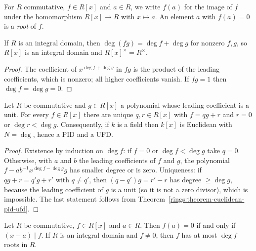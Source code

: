 \begin{notation}\label{rings:notation-evaluation}
For $R$ commutative, $f \in R[x]$ and $a \in R$, we write $f(a)$ for the image of $f$ under
the homomorphism $R[x] \to R$ with $x \mapsto a$. An element $a$ with $f(a) = 0$ is a
\emph{root} of $f$.
\end{notation}

\begin{proposition}\label{rings:proposition-polynomial-domain}
If $R$ is an integral domain, then $\deg(fg) = \deg f + \deg g$ for nonzero $f, g$, so
$R[x]$ is an integral domain and $R[x]^\times = R^\times$.
\end{proposition}

\begin{proof}
The coefficient of $x^{\deg f + \deg g}$ in $fg$ is the product of the leading
coefficients, which is nonzero; all higher coefficients vanish. If $fg = 1$ then
$\deg f = \deg g = 0$.
\end{proof}

\begin{theorem}\label{rings:theorem-polynomial-division}
Let $R$ be commutative and $g \in R[x]$ a polynomial whose leading coefficient is a unit.
For every $f \in R[x]$ there are unique $q, r \in R[x]$ with $f = qg + r$ and $r = 0$ or
$\deg r < \deg g$. Consequently, if $k$ is a field then $k[x]$ is Euclidean with
$N = \deg$, hence a PID and a UFD.
\end{theorem}

\begin{proof}
Existence by induction on $\deg f$: if $f = 0$ or $\deg f < \deg g$ take $q = 0$. Otherwise,
with $a$ and $b$ the leading coefficients of $f$ and $g$, the polynomial
$f - ab^{-1}x^{\deg f - \deg g}g$ has smaller degree or is zero. Uniqueness: if
$qg + r = q'g + r'$ with $q \neq q'$, then $(q - q')g = r' - r$ has degree
$\geq \deg g$, because the leading coefficient of $g$ is a unit (so it is not a zero
divisor), which is impossible. The last statement follows from
Theorem~\ref{rings:theorem-euclidean-pid-ufd}.
\end{proof}

\begin{corollary}\label{rings:corollary-roots}
Let $R$ be commutative, $f \in R[x]$ and $a \in R$. Then $f(a) = 0$ if and only if
$(x - a) \mid f$. If $R$ is an integral domain and $f \neq 0$, then $f$ has at most $\deg f$
roots in $R$.
\end{corollary}

